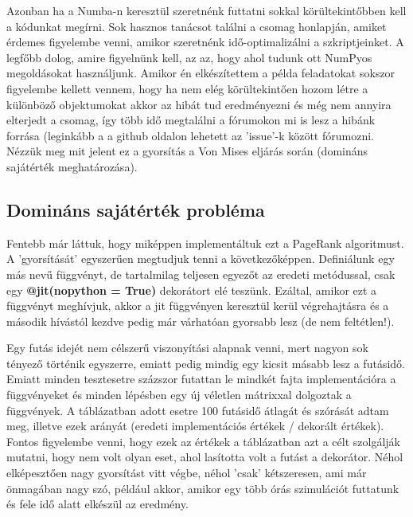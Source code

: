 \documentclass{article}
\theoremstyle{definition}
\theoremstyle{theorem}
\begin{document}
Azonban ha a Numba-n keresztül szeretnénk futtatni sokkal körültekintőbben kell a kódunkat megírni. Sok hasznos tanácsot találni a csomag honlapján, amiket érdemes figyelembe venni, amikor szeretnénk idő-optimalizálni a szkriptjeinket. A legfőbb dolog, amire figyelnünk kell, az az, hogy ahol tudunk ott NumPyos megoldásokat használjunk. Amikor én elkészítettem a példa feladatokat sokszor figyelembe kellett vennem, hogy ha nem elég körültekintően hozom létre a különböző objektumokat akkor az hibát tud eredményezni és még nem annyira elterjedt a csomag, így több idő megtalálni a fórumokon mi is lesz a hibánk forrása (leginkább a a github oldalon lehetett az 'issue'-k között fórumozni.\newline
Nézzük meg mit jelent ez a gyorsítás a Von Mises eljárás során (domináns sajátérték meghatározása).

\subsection{Domináns sajátérték probléma}
Fentebb már láttuk, hogy miképpen implementáltuk ezt a PageRank algoritmust. A 'gyorsítását' egyszerűen megtudjuk tenni a következőképpen. Definiálunk egy más nevű függvényt, de tartalmilag teljesen egyezőt az eredeti metódussal, csak egy \textbf{@jit(nopython = True)} dekorátort elé teszünk. Ezáltal, amikor ezt a függvényt meghívjuk, akkor a jit függvényen keresztül kerül végrehajtásra és a második hívástól kezdve pedig már várhatóan gyorsabb lesz (de nem feltétlen!).

Egy futás idejét nem célszerű viszonyítási alapnak venni, mert nagyon sok tényező történik egyszerre, emiatt pedig mindig egy kicsit másabb lesz a futásidő. Emiatt minden tesztesetre százszor futattan le mindkét fajta implementációra a függvényeket és minden lépésben egy új véletlen mátrixxal dolgoztak a függvények.\newline
A táblázatban adott esetre 100 futásidő átlagát és szórását adtam meg, illetve ezek arányát (eredeti implementációs értékek / dekorált értékek). Fontos figyelembe venni, hogy ezek az értékek a táblázatban azt a célt szolgálják mutatni, hogy nem volt olyan eset, ahol lasította volt a futást a dekorátor. Néhol elképesztően nagy gyorsítást vitt végbe, néhol 'csak' kétszeresen, ami már önmagában nagy szó, például akkor, amikor egy több órás szimulációt futtatunk és fele idő alatt elkészül az eredmény.
\end{document}
